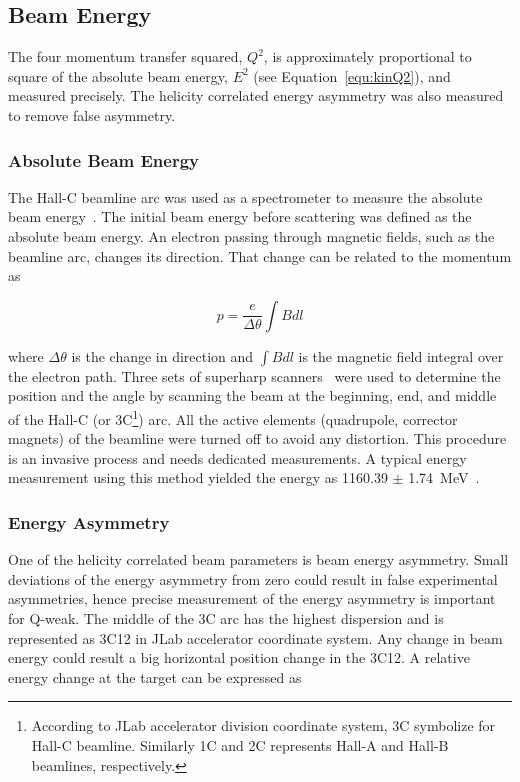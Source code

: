 \subsection{Beam Energy}%
\label{Beam Energy}

The four momentum transfer squared, $Q^{2}$, is approximately proportional to square of the absolute beam energy, $E^{2}$ (see Equation~\ref{equ:kinQ2}), and measured precisely. The helicity correlated energy asymmetry was also measured to remove false asymmetry. 

\subsubsection{Absolute Beam Energy}%
\label{Absolute Beam Energy}

The Hall-C beamline arc was used as a spectrometer to measure the absolute beam energy~\cite{Yan:1993fd}. The initial beam energy before scattering was defined as the absolute beam energy. An electron passing through magnetic fields,
such as the beamline arc, changes its direction.  That change can be
related to the momentum as

\begin{equation} \label{equ:energy1}
p = \frac{e}{\Delta\theta} \int Bdl
\end{equation}

\noindent
where $\Delta\theta$ is the change in direction and $\int Bdl$ is the magnetic field integral over the electron path. Three sets of superharp scanners~\cite{Yan1995261} were used to determine the position and the angle by scanning the beam at the beginning, end, and middle of the Hall-C (or 3C\footnote{According to JLab accelerator division coordinate system, 3C symbolize for Hall-C beamline. Similarly 1C and 2C represents Hall-A and Hall-B beamlines, respectively.}) arc. All the active elements (quadrupole, corrector magnets) of the beamline were turned off to avoid any distortion. This procedure is an invasive process and needs dedicated measurements. A typical energy measurement using this method yielded the energy as 1160.39 $\pm$ 1.74~MeV~\cite{kmyers_qweak}. 


\subsubsection{Energy Asymmetry}%
\label{Energy Asymmetry}


One of the helicity correlated beam parameters is beam energy asymmetry.
Small deviations of the energy asymmetry from zero could result in false experimental asymmetries, hence precise measurement of the energy asymmetry is important for Q-weak. The middle of the 3C arc has the highest dispersion and is represented as 3C12 in JLab accelerator coordinate system. Any change in beam energy could result a big horizontal position change in the 3C12. A relative energy change at the target can be expressed as


